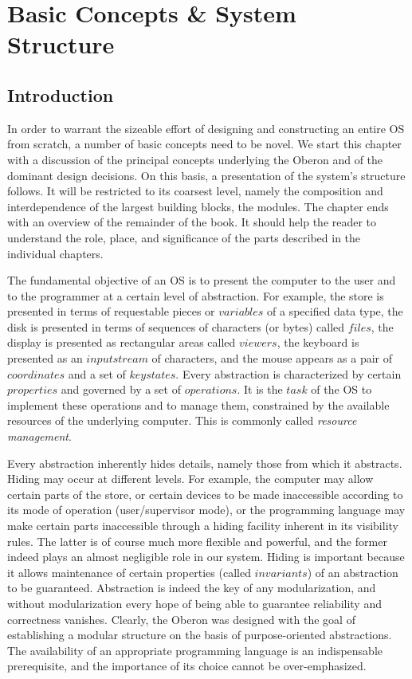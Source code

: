 \chapter{Basic Concepts \& System Structure}
\label{ch:struct}
\section{Introduction}
In order to warrant the sizeable effort of designing and constructing an entire OS from
scratch, a number of basic concepts need to be novel. We start this chapter with a discussion of the
principal concepts underlying the Oberon and of the dominant design decisions. On this
basis, a presentation of the system's structure follows. It will be restricted to its coarsest level,
namely the composition and interdependence of the largest building blocks, the modules. The
chapter ends with an overview of the remainder of the book. It should help the reader to understand
the role, place, and significance of the parts described in the individual chapters.

The fundamental objective of an OS is to present the computer to the user and to the
programmer at a certain level of abstraction. For example, the store is presented in terms of
requestable pieces or $variables$ of a specified data type, the disk is presented in terms of
sequences of characters (or bytes) called $files$, the display is presented as rectangular areas called
$viewers$, the keyboard is presented as an $input stream$ of characters, and the mouse appears as a
pair of $coordinates$ and a set of $key states$. Every abstraction is characterized by certain $properties$
and governed by a set of $operations$. It is the $task$ of the OS to implement these operations and
to manage them, constrained by the available resources of the underlying computer. This is
commonly called \emph{resource management}.

Every abstraction inherently hides details, namely those from which it abstracts. Hiding may occur
at different levels. For example, the computer may allow certain parts of the store, or certain
devices to be made inaccessible according to its mode of operation (user/supervisor mode), or the
programming language may make certain parts inaccessible through a hiding facility inherent in its
visibility rules. The latter is of course much more flexible and powerful, and the former indeed plays
an almost negligible role in our system. Hiding is important because it allows maintenance of
certain properties (called $invariants$) of an abstraction to be guaranteed. Abstraction is indeed the
key of any modularization, and without modularization every hope of being able to guarantee
reliability and correctness vanishes. Clearly, the Oberon was designed with the goal of
establishing a modular structure on the basis of purpose-oriented abstractions. The availability of
an appropriate programming language is an indispensable prerequisite, and the importance of its
choice cannot be over-emphasized.

